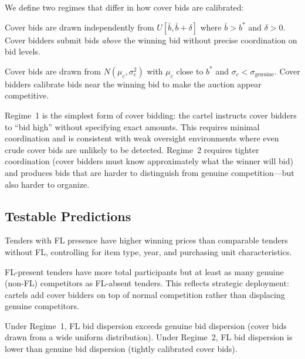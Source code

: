 We define two regimes that differ in how cover bids are calibrated:

\begin{definition}
\label{def:regime1}
Cover bids are drawn independently from $U[\bar{b}, \bar{b} + \delta]$
where $\bar{b} > b^*$ and $\delta > 0$. Cover bidders submit bids
\emph{above} the winning bid without precise coordination on bid levels.
\end{definition}

\begin{definition}
\label{def:regime2}
Cover bids are drawn from $N(\mu_c, \sigma_c^2)$ with $\mu_c$ close to
$b^*$ and $\sigma_c < \sigma_{\text{genuine}}$. Cover bidders calibrate
bids near the winning bid to make the auction appear competitive.
\end{definition}

Regime~1 is the simplest form of cover bidding: the cartel instructs
cover bidders to ``bid high'' without specifying exact amounts. This
requires minimal coordination and is consistent with weak oversight
environments where even crude cover bids are unlikely to be detected.
Regime~2 requires tighter coordination (cover bidders must know
approximately what the winner will bid) and produces bids that are
harder to distinguish from genuine competition---but also harder to
organize.

\subsection{Testable Predictions}

\begin{prediction}
\label{pred:price}
Tenders with FL presence have higher winning prices than comparable
tenders without FL, controlling for item type, year, and purchasing
unit characteristics.
\end{prediction}

\begin{prediction}
\label{pred:selection}
FL-present tenders have more total participants but at least as many
genuine (non-FL) competitors as FL-absent tenders. This reflects
strategic deployment: cartels add cover bidders on top of normal
competition rather than displacing genuine competitors.
\end{prediction}

\begin{prediction}
\label{pred:regime}
Under Regime~1, FL bid dispersion exceeds genuine bid dispersion (cover
bids drawn from a wide uniform distribution). Under Regime~2, FL bid
dispersion is lower than genuine bid dispersion (tightly calibrated
cover bids).
\end{prediction}

